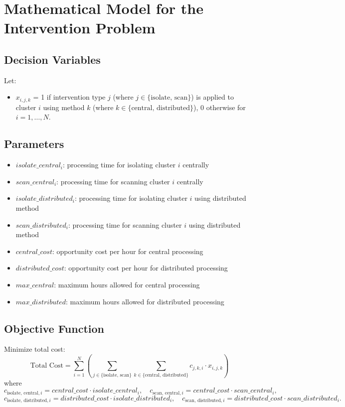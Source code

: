 \documentclass{article}
\begin{document}
\section*{Mathematical Model for the Intervention Problem}

\subsection*{Decision Variables}
Let:
\begin{itemize}
    \item $x_{i,j,k}$ = 1 if intervention type $j$ (where $j \in \{\text{isolate, scan}\}$) is applied to cluster $i$ using method $k$ (where $k \in \{\text{central, distributed}\}$), 0 otherwise for $i = 1,\ldots,N$.
\end{itemize}

\subsection*{Parameters}
\begin{itemize}
    \item $isolate\_central_i$: processing time for isolating cluster $i$ centrally
    \item $scan\_central_i$: processing time for scanning cluster $i$ centrally
    \item $isolate\_distributed_i$: processing time for isolating cluster $i$ using distributed method
    \item $scan\_distributed_i$: processing time for scanning cluster $i$ using distributed method
    \item $central\_cost$: opportunity cost per hour for central processing
    \item $distributed\_cost$: opportunity cost per hour for distributed processing
    \item $max\_central$: maximum hours allowed for central processing
    \item $max\_distributed$: maximum hours allowed for distributed processing
\end{itemize}

\subsection*{Objective Function}
Minimize total cost:
\[
\text{Total Cost} = \sum_{i=1}^N \left( \sum_{j \in \{\text{isolate, scan}\}} \sum_{k \in \{\text{central, distributed}\}} c_{j,k,i} \cdot x_{i,j,k} \right)
\]
where
\[
c_{\text{isolate, central},i} = central\_cost \cdot isolate\_central_i,
\quad c_{\text{scan, central},i} = central\_cost \cdot scan\_central_i,
\]
\[
c_{\text{isolate, distributed},i} = distributed\_cost \cdot isolate\_distributed_i,
\quad c_{\text{scan, distributed},i} = distributed\_cost \cdot scan\_distributed_i.
\]
\end{document}
